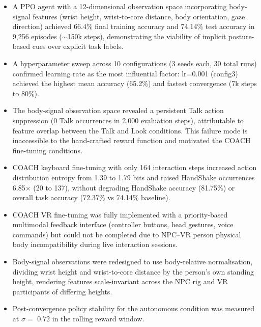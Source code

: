 \documentclass[../report.tex]{subfiles}
\begin{document}
    \begin{itemize}
        \item A PPO agent with a 12-dimensional observation space incorporating body-signal features (wrist height, wrist-to-core distance, body orientation, gaze direction) achieved 66.4\% final training accuracy and 74.14\% test accuracy in 9,256 episodes ($\sim$150k steps), demonstrating the viability of implicit posture-based cues over explicit task labels.

        \item A hyperparameter sweep across 10 configurations (3 seeds each, 30 total runs) confirmed learning rate as the most influential factor: lr=0.001 (config3) achieved the highest mean accuracy (65.2\%) and fastest convergence (7k steps to 80\%).

        \item The body-signal observation space revealed a persistent Talk action suppression (0 Talk occurrences in 2,000 evaluation steps), attributable to feature overlap between the Talk and Look conditions. This failure mode is inaccessible to the hand-crafted reward function and motivated the COACH fine-tuning conditions.

        \item COACH keyboard fine-tuning with only 164 interaction steps increased action distribution entropy from 1.39 to 1.79 bits and raised HandShake occurrences 6.85$\times$ (20 to 137), without degrading HandShake accuracy (81.75\%) or overall task accuracy (72.37\% vs 74.14\% baseline).

        \item COACH VR fine-tuning was fully implemented with a priority-based multimodal feedback interface (controller buttons, head gestures, voice commands) but could not be completed due to NPC--VR person physical body incompatibility during live interaction sessions.

        \item Body-signal observations were redesigned to use body-relative normalisation, dividing wrist height and wrist-to-core distance by the person's own standing height, rendering features scale-invariant across the NPC rig and VR participants of differing heights.

        \item Post-convergence policy stability for the autonomous condition was measured at $\sigma = $ 0.72 in the rolling reward window.
    \end{itemize}
\end{document}
